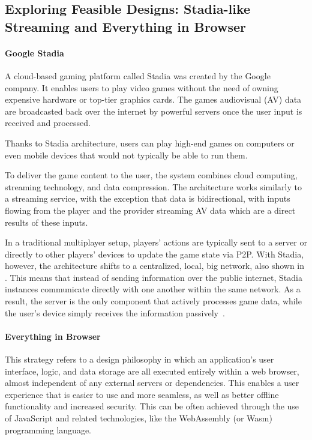 \subsection{Exploring Feasible Designs: Stadia-like Streaming and Everything in Browser}
\label{ssec:exploring-feasible-designs-stadia-like-streaming-and-everything-in-browser}
\paragraph{Google Stadia} A cloud-based gaming platform called Stadia was created by the Google company. It enables users to play video games without the need of owning expensive hardware or top-tier graphics cards. The games audiovisual (AV) data are broadcasted back over the internet by powerful servers once the user input is received and processed.\newline


Thanks to Stadia architecture, users can play high-end games on computers or even mobile devices that would not typically be able to run them.\newline

To deliver the game content to the user, the system combines cloud computing, streaming technology, and data compression. The architecture works similarly to a streaming service, with the exception that data is bidirectional, with inputs flowing from the player and the provider streaming AV data which are a direct results of these inputs.\newline

In a traditional multiplayer setup, players' actions are typically sent to a server or directly to other players' devices to update the game state via P2P. With Stadia, however, the architecture shifts to a centralized, local, big network, also shown in . This means that instead of sending information over the public internet, Stadia instances communicate directly with one another within the same network. As a result, the server is the only component that actively processes game data, while the user's device simply receives the information passively~\cite{AFirstLo55:online}.

\paragraph{Everything in Browser} This strategy refers to a design philosophy in which an application's user interface, logic, and data storage are all executed entirely within a web browser, almost independent of any external servers or dependencies. This enables a user experience that is easier to use and more seamless, as well as better offline functionality and increased security. This can be often achieved through the use of JavaScript and related technologies, like the WebAssembly (or Wasm) programming language.\newline

